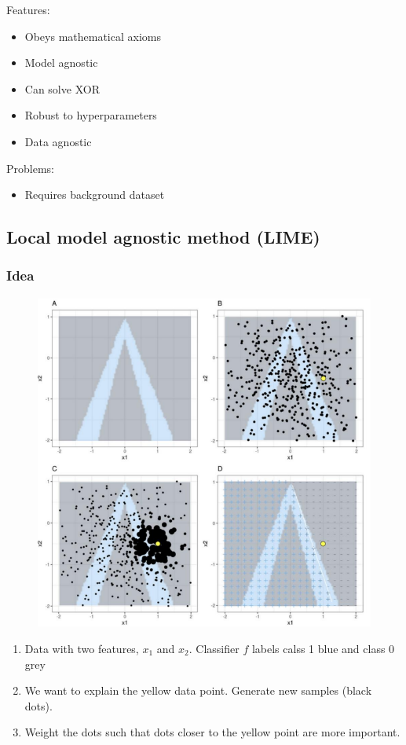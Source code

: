Features:
\begin{itemize}
    \item Obeys mathematical axioms
    \item Model agnostic
    \item Can solve XOR 
    \item Robust to hyperparameters
    \item Data agnostic
\end{itemize}
Problems:
\begin{itemize}
    \item Requires background dataset
\end{itemize}

\subsection{Local model agnostic method (LIME)}
\subsubsection{Idea}
\begin{figure}
    \includegraphics[width = \columnwidth]{figures/XAI3/LocalModelAngosticMethodIdea.png}
\end{figure}
\begin{enumerate}[label = (\Alph*)]
    \item Data with two features, \(x_1\) and \(x_2\). Classifier \(f\) labels calss 1 blue and class 0 grey
    \item We want to explain the yellow data point. Generate new samples (black dots).
    \item Weight the dots such that dots closer to the yellow point are more important.
\end{enumerate}

